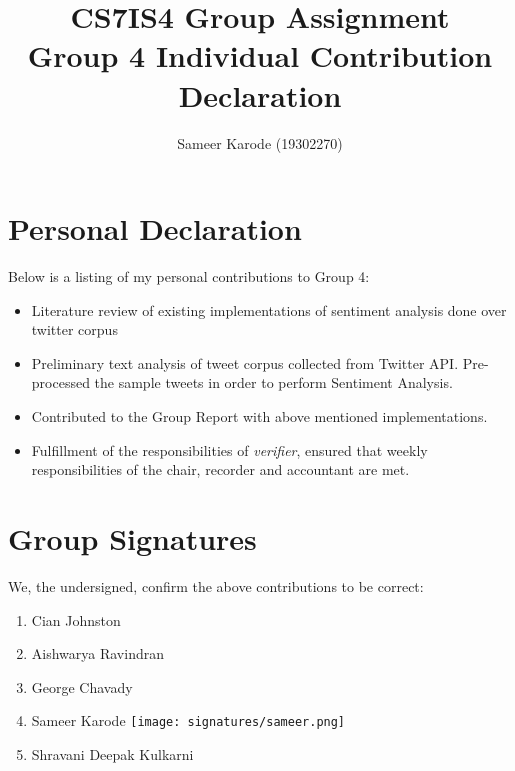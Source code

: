 \documentclass[a4paper,10pt]{article}
\begin{document}
\title{
    CS7IS4 Group Assignment \\
    \large Group 4 Individual Contribution Declaration
}
\author{
    Sameer Karode (19302270)
}

\maketitle

\section{Personal Declaration}

Below is a listing of my personal contributions to Group 4:

\begin{itemize}
    \item {Literature review of existing implementations of sentiment analysis done over twitter corpus}
    \item{
        Preliminary text analysis of tweet corpus collected from Twitter API. Pre-processed the sample tweets in order to perform Sentiment Analysis.
    }
    \item{
       Contributed to the Group Report with above mentioned implementations.
    }
    \item{
        Fulfillment of the responsibilities of \textit{verifier}, ensured that weekly responsibilities of the chair, recorder and accountant are met.
    }
\end{itemize}

\section{Group Signatures}

We, the undersigned, confirm the above contributions to be correct:

\begin{enumerate}
    \item{
        Cian Johnston
    }
    \item{
        Aishwarya Ravindran
    }
    \item{
        George Chavady
    }
    \item{
        Sameer Karode \texttt{[image: signatures/sameer.png]}
    }
    \item{
        Shravani Deepak Kulkarni
    }

\end{enumerate}
\end{document}
